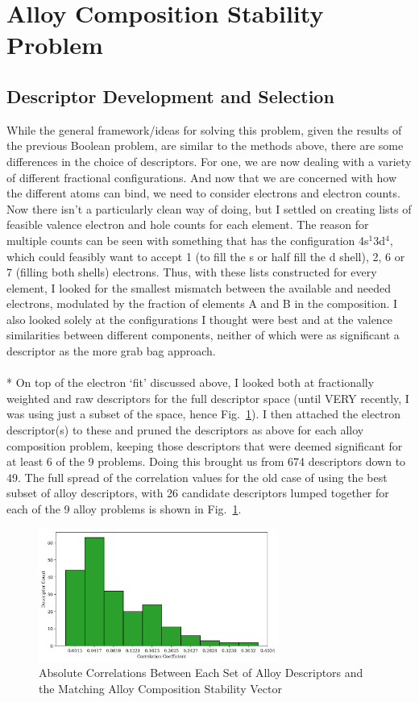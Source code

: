 \documentclass[11pt]{article}
\begin{document}
\section{Alloy Composition Stability Problem}
\subsection{Descriptor Development and Selection}
\noindent While the general framework/ideas for solving this problem, given the results of the previous Boolean problem, are similar to the methods above, there are some differences in the choice of descriptors. For one, we are now dealing with a variety of different fractional configurations. And now that we are concerned with how the different atoms can bind, we need to consider electrons and electron counts. Now there isn't a particularly clean way of doing, but I settled on creating lists of feasible valence electron and hole counts for each element. The reason for multiple counts can be seen with something that has the configuration 4s$^1$3d$^4$, which could feasibly want to accept 1 (to fill the s or half fill the d shell), 2, 6 or 7 (filling both shells) electrons. Thus, with these lists constructed for every element, I looked for the smallest mismatch between the available and needed electrons, modulated by the fraction of elements A and B in the composition. I also looked solely at the configurations I thought were best and at the valence similarities between different components, neither of which were as significant a descriptor as the more grab bag approach. 
\\
\\*
On top of the electron `fit' discussed above, I looked both at fractionally weighted and raw descriptors for the full descriptor space (until VERY recently, I was using just a subset of the space, hence Fig.~\ref{alloy_corr_hist}). I then attached the electron descriptor(s) to these and pruned the descriptors as above for each alloy composition problem, keeping those descriptors that were deemed significant for at least 6 of the 9 problems. Doing this brought us from 674 descriptors down to 49. The full spread of the correlation values for the old case of using the best subset of alloy descriptors, with 26 candidate descriptors lumped together for each of the 9 alloy problems is shown in Fig.~\ref{alloy_corr_hist}.

\begin{figure}[H]
\centering
\includegraphics[width=0.7\textwidth]{alloy_comp_descriptor_hist.png}
\caption{Absolute Correlations Between Each Set of Alloy Descriptors and the Matching Alloy Composition Stability Vector}
\label{alloy_corr_hist}
\end{figure}
\end{document}
